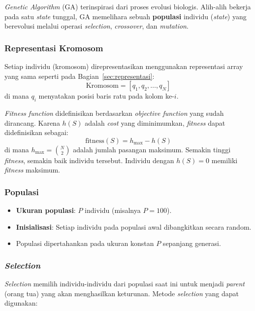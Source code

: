 \documentclass[12pt,a4paper]{article}
\begin{document}
\textit{Genetic Algorithm} (GA) terinspirasi dari proses evolusi biologis. Alih-alih bekerja pada satu \textit{state} tunggal, GA memelihara sebuah \textbf{populasi} individu (\textit{state}) yang berevolusi melalui operasi \textit{selection}, \textit{crossover}, dan \textit{mutation}.

\subsubsection{Representasi Kromosom}
\label{subsubsec:kromosom}

Setiap individu (kromosom) direpresentasikan menggunakan representasi array yang sama seperti pada Bagian~\ref{sec:representasi}:
\[
    \text{Kromosom} = [q_1, q_2, \ldots, q_N]
\]
di mana $q_i$ menyatakan posisi baris ratu pada kolom ke-$i$.

\textit{Fitness function} didefinisikan berdasarkan \textit{objective function} yang sudah dirancang. Karena $h(S)$ adalah \textit{cost} yang diminimumkan, \textit{fitness} dapat didefinisikan sebagai:
\[
    \text{fitness}(S) = h_{\max} - h(S)
\]
di mana $h_{\max} = \binom{N}{2}$ adalah jumlah pasangan maksimum. Semakin tinggi \textit{fitness}, semakin baik individu tersebut. Individu dengan $h(S) = 0$ memiliki \textit{fitness} maksimum.

\subsubsection{Populasi}
\label{subsubsec:populasi}

\begin{itemize}
    \item \textbf{Ukuran populasi}: $P$ individu (misalnya $P = 100$).
    \item \textbf{Inisialisasi}: Setiap individu pada populasi awal dibangkitkan secara random.
    \item Populasi dipertahankan pada ukuran konstan $P$ sepanjang generasi.
\end{itemize}

\subsubsection{\textit{Selection}}
\label{subsubsec:selection}

\textit{Selection} memilih individu-individu dari populasi saat ini untuk menjadi \textit{parent} (orang tua) yang akan menghasilkan keturunan. Metode \textit{selection} yang dapat digunakan:
\end{document}
